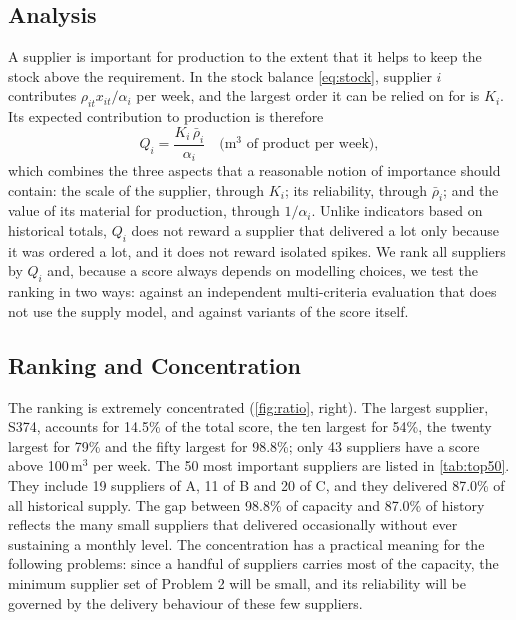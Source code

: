 \documentclass[11pt,a4paper]{article}
\begin{document}
\subsection{Analysis}
A supplier is important for production to the extent that it helps to keep the stock above the requirement.
In the stock balance \cref{eq:stock}, supplier $i$ contributes $\rho_{it}x_{it}/\alpha_i$ per week, and the largest order it can be relied on for is $K_i$.
Its expected contribution to production is therefore
\begin{equation}\label{eq:score}
Q_i = \frac{K_i\,\bar\rho_i}{\alpha_i}\quad\text{(m$^3$ of product per week)},
\end{equation}
which combines the three aspects that a reasonable notion of importance should contain: the scale of the supplier, through $K_i$; its reliability, through $\bar\rho_i$; and the value of its material for production, through $1/\alpha_i$.
Unlike indicators based on historical totals, $Q_i$ does not reward a supplier that delivered a lot only because it was ordered a lot, and it does not reward isolated spikes.
We rank all suppliers by $Q_i$ and, because a score always depends on modelling choices, we test the ranking in two ways: against an independent multi-criteria evaluation that does not use the supply model, and against variants of the score itself.

\subsection{Ranking and Concentration}
The ranking is extremely concentrated (\cref{fig:ratio}, right).
The largest supplier, S374, accounts for 14.5\% of the total score, the ten largest for 54\%, the twenty largest for 79\% and the fifty largest for 98.8\%; only 43 suppliers have a score above 100\,m$^3$ per week.
The 50 most important suppliers are listed in \cref{tab:top50}.
They include 19 suppliers of A, 11 of B and 20 of C, and they delivered 87.0\% of all historical supply.
The gap between 98.8\% of capacity and 87.0\% of history reflects the many small suppliers that delivered occasionally without ever sustaining a monthly level.
The concentration has a practical meaning for the following problems: since a handful of suppliers carries most of the capacity, the minimum supplier set of Problem 2 will be small, and its reliability will be governed by the delivery behaviour of these few suppliers.
\end{document}
